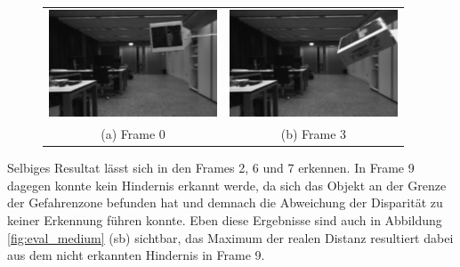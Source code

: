 	\begin{figure}[h]
		\centering
		\begin{tabular}{cc}
		\includegraphics[width=5cm]{img/evaluation/medium_0_left}&
		\includegraphics[width=5cm]{img/evaluation/medium_3_left}\\
		(a) Frame 0 &  (b) Frame 3
		\end{tabular}
		\caption{}
		\label{fig:eval_medium_fails}
	\end{figure}
	
	\noindent
	Selbiges Resultat lässt sich in den Frames 2, 6 und 7 erkennen. In Frame 9 dagegen konnte kein Hindernis erkannt werde, da sich das Objekt an der Grenze der Gefahrenzone befunden hat und demnach die Abweichung der Disparität zu keiner Erkennung führen konnte. Eben diese Ergebnisse sind auch in Abbildung \ref{fig:eval_medium} (sb) sichtbar, das Maximum der realen Distanz resultiert dabei aus dem nicht erkannten Hindernis in Frame 9.\\
	

